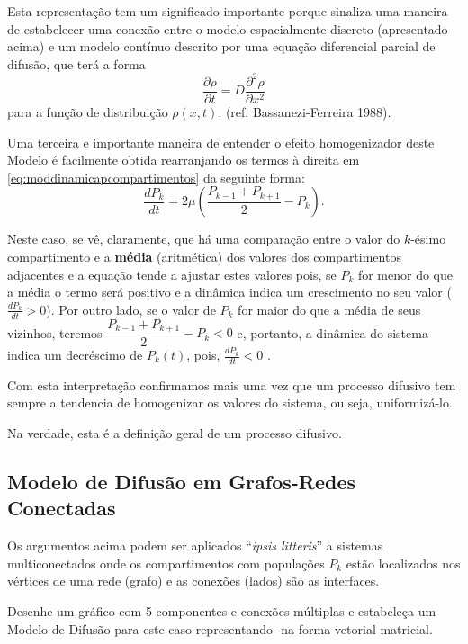     Esta representação tem um significado importante porque sinaliza uma maneira de estabelecer uma conexão entre o modelo espacialmente discreto (apresentado acima) e um modelo contínuo descrito por uma equação diferencial parcial de difusão, que terá a forma
    \[\dfrac{\partial \rho}{\partial t} = D \dfrac{\partial^2 \rho}{\partial x^2}\]
    para a função de distribuição \(\rho(x,t)\). (ref. Bassanezi-Ferreira 1988).
    
    Uma terceira e importante maneira de entender o efeito homogenizador deste Modelo é facilmente obtida rearranjando os termos à direita em \eqref{eq:moddinamicapcompartimentos} da seguinte forma:
    \[\dfrac{dP_k}{dt} = 2\mu \left(\dfrac{P_{k-1} + P_{k+1}}{2}-P_{k}\right).\] 

    Neste caso, se vê, claramente, que há uma comparação entre o valor do \(k\)-ésimo compartimento e a \textbf{média} (aritmética) dos valores dos compartimentos adjacentes e a equação tende a ajustar estes valores pois, se \(P_k\) for menor do que a média o termo será positivo e a dinâmica indica um crescimento no seu valor (\(\frac{dP_k}{dt} > 0\)). Por outro lado, se o  valor de \(P_k\) for maior do que a média de seus vizinhos, teremos \(\dfrac{P_{k-1}+P_{k+1}}{2}-P_{k} < 0\) e, portanto, a dinâmica do sistema indica um decréscimo de \(P_k(t)\), pois, \(\frac{dP_k}{dt} < 0\) . 

    Com esta interpretação confirmamos mais uma vez que um processo difusivo tem sempre a tendencia de homogenizar os valores do sistema, ou seja, uniformizá-lo. 

    Na verdade, esta é a definição geral de um processo difusivo. 

\subsection{Modelo de Difusão em Grafos-Redes Conectadas}

    Os argumentos acima podem ser aplicados ``\textit{ipsis litteris}'' a sistemas multiconectados onde os compartimentos com populações \(P_k\) estão localizados nos vértices de uma rede (grafo) e as conexões (lados) são as interfaces. 


    \begin{exercise}
    Desenhe um gráfico com 5 componentes e conexões múltiplas e estabeleça um Modelo de Difusão para este caso representando- na forma vetorial-matricial.
    \end{exercise}

